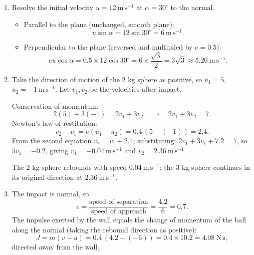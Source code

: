 \documentclass[11pt]{article}
\newcounter{popsec}
\newcounter{popsub}
\newcommand{\courssub}[1]{%
  \stepcounter{popsub}%
  \par\vspace{9pt}\noindent{\popxbold\fontsize{11.5}{13}\selectfont\color{popink}{\color{poporange}\thepopsec.\thepopsub}\hspace{6pt}#1}\par\nopagebreak\vspace{4pt}
}
\begin{document}
\begin{corrige}
\begin{enumerate}
\item Resolve the initial velocity $u=12\ \mathrm{m\,s^{-1}}$ at $\alpha=30^{\circ}$ to the normal.
\begin{itemize}
\item Parallel to the plane (unchanged, smooth plane):
\[ u\sin\alpha=12\sin 30^{\circ}=6\ \mathrm{m\,s^{-1}}. \]
\item Perpendicular to the plane (reversed and multiplied by $e=0.5$):
\[ eu\cos\alpha=0.5\times 12\cos 30^{\circ}=6\times\frac{\sqrt3}{2}=3\sqrt3\approx 5.20\ \mathrm{m\,s^{-1}}. \]
\end{itemize}
\item Take the direction of motion of the $2$ kg sphere as positive, so $u_{1}=5$, $u_{2}=-1\ \mathrm{m\,s^{-1}}$. Let $v_{1},v_{2}$ be the velocities after impact.

Conservation of momentum:
\[ 2(5)+3(-1)=2v_{1}+3v_{2}\quad\Longrightarrow\quad 2v_{1}+3v_{2}=7. \]
Newton's law of restitution:
\[ v_{2}-v_{1}=e(u_{1}-u_{2})=0.4\,(5-(-1))=2.4. \]
From the second equation $v_{2}=v_{1}+2.4$; substituting: $2v_{1}+3v_{1}+7.2=7$, so $5v_{1}=-0.2$, giving $v_{1}=-0.04\ \mathrm{m\,s^{-1}}$ and $v_{2}=2.36\ \mathrm{m\,s^{-1}}$.

The $2$ kg sphere rebounds with speed $0.04\ \mathrm{m\,s^{-1}}$; the $3$ kg sphere continues in its original direction at $2.36\ \mathrm{m\,s^{-1}}$.
\item The impact is normal, so
\[ e=\frac{\text{speed of separation}}{\text{speed of approach}}=\frac{4.2}{6}=0.7. \]
The impulse exerted by the wall equals the change of momentum of the ball along the normal (taking the rebound direction as positive):
\[ J=m(v-u)=0.4\,(4.2-(-6))=0.4\times 10.2=4.08\ \mathrm{N\,s}, \]
directed away from the wall.
\end{enumerate}
\end{corrige}

\courssub{I practise}
\end{document}
